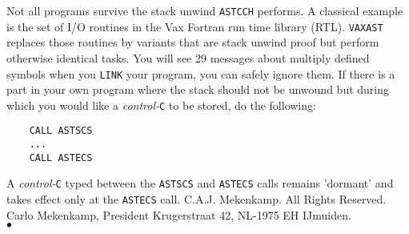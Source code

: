 \par
Not all programs survive the stack unwind {\tt ASTCCH} performs.
A classical example is the set of I/O routines in the Vax
Fortran run time library (RTL). {\tt VAXAST} replaces those routines by
variants that are stack unwind proof but perform otherwise identical
tasks. You will see 29 messages about multiply defined symbols
when you {\tt LINK} your program, you can safely ignore them.
\newpage
If there is a part in your own program where the stack should not
be unwound but during which you would like a {\it control-}{\tt C} to be
stored, do the following:
\begin{verbatim}
    CALL ASTSCS
    ...
    CALL ASTECS
\end{verbatim}
A {\it control-}{\tt C} typed between the {\tt ASTSCS} and {\tt ASTECS}
calls remains 'dormant' and takes effect only at the {\tt ASTECS} call.
 C.A.J. Mekenkamp. All Rights Reserved. \\
Carlo Mekenkamp, President Krugerstraat 42, NL-1975 EH IJmuiden.
\\ $\bullet$
